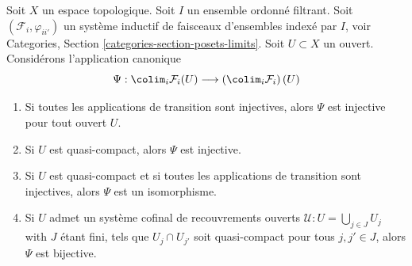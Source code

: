 \begin{lemma}
\label{lemma-directed-colimits-sections}
Soit $X$ un espace topologique. Soit $I$ un ensemble ordonné filtrant.
Soit $(\mathcal{F}_i, \varphi_{ii'})$ un système inductif de faisceaux d'ensembles
indexé par $I$, voir
Categories, Section \ref{categories-section-posets-limits}.
Soit $U \subset X$ un ouvert.
Considérons l'application canonique
$$
\Psi :
\colim_i \mathcal{F}_i(U)
\longrightarrow
\left(\colim_i \mathcal{F}_i\right)(U)
$$
\begin{enumerate}
\item Si toutes les applications de transition sont injectives, alors
$\Psi$ est injective pour tout ouvert $U$.
\item Si $U$ est quasi-compact, alors $\Psi$ est injective.
\item Si $U$ est quasi-compact et si toutes les applications de transition sont injectives,
alors $\Psi$ est un isomorphisme.
\item Si $U$ admet un système cofinal de recouvrements ouverts
$\mathcal{U} : U = \bigcup_{j\in J} U_j$ with
$J$ étant fini, tels que $U_j \cap U_{j'}$ soit quasi-compact
pour tous $j, j' \in J$, alors $\Psi$ est bijective.
\end{enumerate}
\end{lemma}

